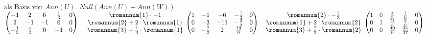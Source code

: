 \documentclass{article}
\begin{document}
        als Basis von $Ann(U)$.
        \newline
        \newline
        \newline
        $Null(Ann(U) + Ann(W))$
        \newline
        \newline
        \newline
        \begin{math}
          \begin{pmatrix}
            -1 & 2 & 6 & \frac{1}{3} & 0 \\
            2 & -1 & -1 & 0 & 0 \\
            - \frac{1}{3} & \frac{4}{3} & 0 & -1 & 0 \\
            \end{pmatrix}
            \;
            \begin{matrix}
              & \romannum{1} \cdot -1 \\
              & \romannum{2} + 2 \cdot \romannum{1} \\
              & \romannum{3} - \frac{1}{3} \cdot \romannum{1} \\
            \end{matrix}
            \;
            \begin{pmatrix}
              1 & -1 & -6 & -\frac{1}{3} & 0 \\
              0 & -3 & -11 & -\frac{2}{3} & 0 \\
              0 & -\frac{2}{3} & 2 & \frac{10}{9} & 0 \\
              \end{pmatrix}
              \begin{matrix}
                & \romannum{2} \cdot -\frac{1}{3} \\
                & \romannum{1} + 2 \cdot \romannum{2} \\
                & \romannum{3} + \frac{2}{3} \cdot \romannum{2} \\
                \end{matrix}
                \;
                \begin{pmatrix}
                  1 & 0 & \frac{4}{3} & \frac{1}{9} & 0 \\
                  0 & 1 & \frac{11}{3} & \frac{2}{9} & 0 \\
                  0 & 0 & \frac{40}{9} & \frac{34}{27} & 0 \\
                \end{pmatrix}

\end{math}
\end{document}
